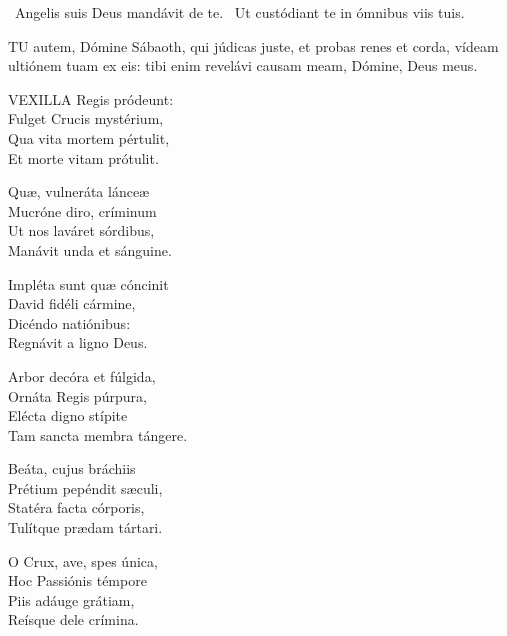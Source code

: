 \V\ Angelis suis Deus mandávit de te. \R\ Ut custódiant te in ómnibus viis tuis.





\lettrine[lines=2]{T}{U} autem, Dómine Sábaoth, qui júdicas juste, et probas renes et corda, vídeam ultiónem tuam ex eis: tibi enim revelávi causam meam, Dómine, Deus meus.



\lettrine[lines=2]{V}{EXILLA} Regis pródeunt:\\
Fulget Crucis mystérium,\\
Qua vita mortem pértulit,\\
Et morte vitam prótulit.

Quæ, vulneráta lánceæ\\
Mucróne diro, críminum\\
Ut nos laváret sórdibus,\\
Manávit unda et sánguine.

Impléta sunt quæ cóncinit\\
David fidéli cármine,\\
Dicéndo natiónibus:\\
Regnávit a ligno Deus.

Arbor decóra et fúlgida,\\
Ornáta Regis púrpura,\\
Elécta digno stípite\\
Tam sancta membra tángere.

Beáta, cujus bráchiis\\
Prétium pepéndit sæculi,\\
Statéra facta córporis,\\
Tulítque prædam tártari.


O Crux, ave, spes única,\\
Hoc Passiónis témpore\\
Piis adáuge grátiam,\\
Reísque dele crímina.

